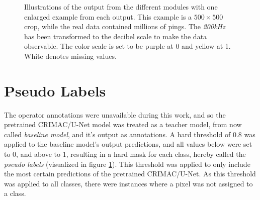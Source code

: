         
        \begin{figure}[H]
            \centering
            
            \caption[Module outputs illustration]{Illustrations of the output from the different modules with one enlarged example from each output. This example is a $500\times500$ crop, while the real data contained millions of pings. The \textit{200kHz} has been transformed to the decibel scale to make the data observable. The color scale is set to be purple at 0 and yellow at 1. White denotes missing values.}
          	\medskip 
            \label{Module_outputs_illustration_fig}
        \end{figure}

    \section{Pseudo Labels} \label{Pseudo label}
        The operator annotations were unavailable during this work, and so the pretrained CRIMAC/U-Net model was treated as a teacher model, from now called \textit{baseline model}, and it's output as annotations. A hard threshold of 0.8 was applied to the baseline model’s output predictions, and all values below were set to 0, and above to 1, resulting in a hard mask for each class, hereby called the \textit{pseudo labels} (visualized in figure \ref{Pseudo label}). This threshold was applied to only include the most certain predictions of the pretrained CRIMAC/U-Net. As this threshold was applied to all classes, there were instances where a pixel was not assigned to a class.
        
        
